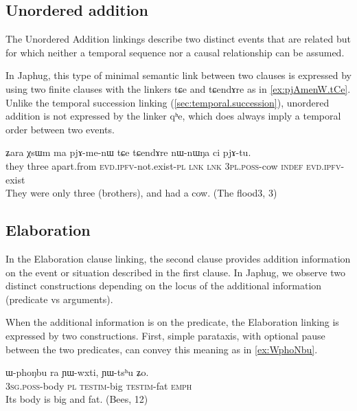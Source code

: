 \documentclass[oldfontcommands,oneside,a4paper,11pt]{article}
\newcommand{\ipa}[1]{{\phon \mbox{#1}}} %
\begin{document}
\subsection{Unordered addition} \label{sec:unordered}
The Unordered Addition linkings describe  two distinct events that are related but for which neither a temporal sequence nor a causal relationship can be assumed. 

In Japhug, this type of minimal semantic link between two clauses is expressed by using two finite clauses with the linkers \ipa{tɕe} and \ipa{tɕendɤre}  as in \ref{ex:pjAmenW.tCe}. Unlike the  temporal succession linking (\ref{sec:temporal.succession}), unordered addition is not expressed by  the linker \ipa{qʰe}, which does always imply a temporal order between two events.

 \begin{exe}
\ex \label{ex:pjAmenW.tCe}
\gll
\ipa{ʑara}  	\ipa{χsɯm}  	\ipa{ma}  	\ipa{pjɤ-me-nɯ}  	\ipa{tɕe}  	\ipa{tɕendɤre}  	\ipa{nɯ-nɯŋa}  	\ipa{ci}  	\ipa{pjɤ-tu.}  \\
they three apart.from \textsc{evd.ipfv}-not.exist-\textsc{pl} \textsc{lnk} \textsc{lnk} \textsc{3pl.poss}-cow \textsc{indef} \textsc{evd.ipfv}-exist \\
\glt They were only three (brothers), and had a cow. (The flood3, 3)
\end{exe}


\subsection{Elaboration} \label{sec:elaboration}
In the Elaboration clause linking, the second clause provides addition information on the event or situation described in the first clause. In Japhug, we observe two distinct constructions depending on the locus of the additional information (predicate vs arguments).


When the additional information is on the predicate, the Elaboration linking is expressed by two constructions. First, simple parataxis, with optional pause between the two predicates, can convey this meaning as in \ref{ex:WphoNbu}.

\begin{exe}
\ex \label{ex:WphoNbu}
\gll
 \ipa{ɯ-phoŋbu}  	\ipa{ra}  	\ipa{ɲɯ-wxti,}  	\ipa{ɲɯ-tsʰu}  	\ipa{ʑo.}  \\
\textsc{ 3sg.poss}-body \textsc{pl} \textsc{testim}-big \textsc{testim}-fat \textsc{emph} \\
\glt Its body is big and fat. (Bees, 12)
\end{exe}
\end{document}
